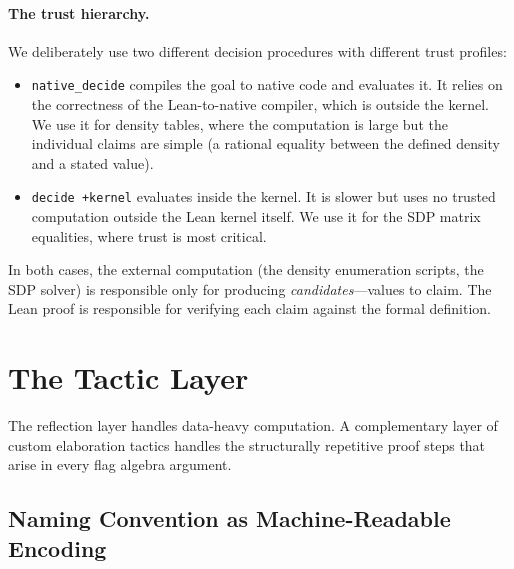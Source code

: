 \documentclass{article}
\newcommand{\lean}[1]{\texttt{#1}}
\begin{document}
\paragraph{The trust hierarchy.}
We deliberately use two different decision procedures with different trust
profiles:
\begin{itemize}
  \item \lean{native\_decide} compiles the goal to native code and evaluates
    it.  It relies on the correctness of the Lean-to-native compiler, which is
    outside the kernel.  We use it for density tables, where the computation is
    large but the individual claims are simple (a rational equality between the
    defined density and a stated value).

  \item \lean{decide +kernel} evaluates inside the kernel.  It is slower but
    uses no trusted computation outside the Lean kernel itself.  We use it for
    the SDP matrix equalities, where trust is most critical.
\end{itemize}
In both cases, the external computation (the density enumeration scripts, the
SDP solver) is responsible only for producing \emph{candidates}---values to
claim.  The Lean proof is responsible for verifying each claim against the
formal definition.

\section{The Tactic Layer}
\label{sec:tactics}

The reflection layer handles data-heavy computation.  A complementary layer of
custom elaboration tactics handles the structurally repetitive proof steps that
arise in every flag algebra argument.

\subsection{Naming Convention as Machine-Readable Encoding}
\end{document}
